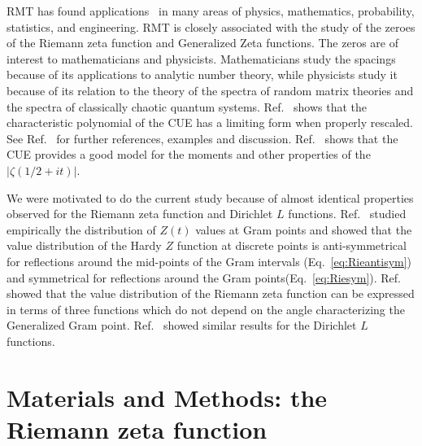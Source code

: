 \documentclass[twoside]{article}
\begin{document}
RMT has found applications~\cite{KeatingSnaith 2000,Odlyzko 1992} 
in many areas of physics, mathematics,  probability, statistics, and engineering. 
 RMT is closely associated with the study of the zeroes of the Riemann zeta function 
 and Generalized Zeta functions. The zeros are of interest to mathematicians and physicists. 
Mathematicians 
study the spacings because of its applications to analytic number theory, 
while physicists study it because of its  relation 
to the theory of the spectra of random matrix theories 
and the spectra of classically chaotic quantum systems.
Ref.~\cite{Chhaibi 2014} shows that the characteristic polynomial 
of the CUE has a limiting form when properly rescaled. 
See Ref.~\cite{Francesco 2007,os6, Hanga 2020} for  further references,
examples and discussion. 
 Ref.~\cite{KeatingSnaith 2000} shows that the CUE provides
a good model for the moments and other properties of the $|\zeta(1/2 + it)|$.

We were motivated to do the current study because of almost identical 
properties observed
for the Riemann zeta function and Dirichlet $L$ functions. 
Ref.~\cite{Shanker 2018a,Shanker 2018b} studied empirically 
the distribution of $Z(t)$ values 
at Gram points and showed  that  the  value
distribution of the Hardy $Z$ function at discrete points is anti-symmetrical for 
reflections around the mid-points of the Gram intervals (Eq.~\ref{eq:Rieantisym}) 
and symmetrical for reflections around the Gram points(Eq.~\ref{eq:Riesym}). 
Ref.~\cite{Shanker 2020} showed that the value distribution of the Riemann zeta function 
can be expressed in terms of three  functions 
 which do not depend on the angle characterizing the Generalized Gram point. 
Ref.~\cite{Shanker 2022} showed similar results for the Dirichlet $L$ functions.

\section{\label{sec2}Materials and Methods: the Riemann zeta function}
\end{document}
